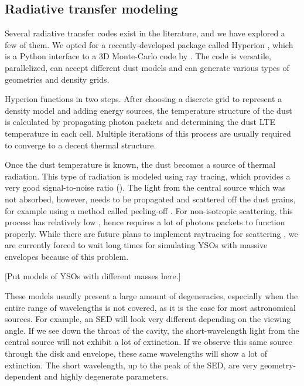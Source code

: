 %
%

\subsection{Radiative transfer modeling}
\label{subsubsec:radiative}

Several radiative transfer codes exist in the literature, and we have explored a few of them. We opted for a recently-developed package called Hyperion \citep{Robitaille:2011fc}, which is a Python interface to a 3D Monte-Carlo code by \citet{Whitney:2013cw}. The code is versatile, parallelized, can accept different dust models and can generate various types of geometries and density grids.

Hyperion functions in two steps. After choosing a discrete grid to represent a density model and adding energy sources, the temperature structure of the dust is calculated by propagating photon packets and determining the dust LTE temperature in each cell. Multiple iterations of this process are usually required to converge to a decent thermal structure.

Once the dust temperature is known, the dust becomes a source of thermal radiation. This type of radiation is modeled using ray tracing, which provides a very good signal-to-noise ratio (\SNR). The light from the central source which was not absorbed, however, needs to be propagated and scattered off the dust grains, for example using a method called peeling-off \citep{YusefZadeh:1984ff}. For non-isotropic scattering, this process has relatively low \SNR, hence requires a lot of photons packets to function properly. While there are future plans to implement raytracing for scattering \citep{Robitaille:2011fc}, we are currently forced to wait long times for simulating YSOs with massive envelopes because of this problem.

[Put models of YSOs with different masses here.]

These models usually present a large amount of degeneracies, especially when the entire range of wavelengths is not covered, as it is the case for most astronomical sources. For example, an SED will look very different depending on the viewing angle. If we see down the throat of the cavity, the short-wavelength light from the central source will not exhibit a lot of extinction. If we observe this same source through the disk and envelope, these same wavelengths will show a lot of extinction. The short wavelength, up to the peak of the SED, are very geometry-dependent and highly degenerate parameters.

